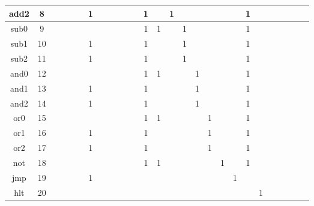 \documentclass[UTF8]{ctexrep}
\begin{document}
\begin{landscape}
\begin{center}
{\begin{tabular}{|c|c|c|c|c|c|c|c|c|c|c|c|c|c|c|c|c|c|c|c|c|c|c|c|c|c|c|}
add2  & 8           &   &   &   &   & 1 &   &   &   &   &   & 1  &    & 1  &    &    &    &    &    & 1  &    &     &     &     &    &    \\ \hline
sub0  & 9           &   &   &   &   &   &   &   &   &   &   & 1  & 1  &    & 1  &    &    &    &    & 1  &    &     &     &     &    &    \\ \hline
sub1  & 10          &   &   &   &   & 1 &   &   &   &   &   & 1  &    &    & 1  &    &    &    &    & 1  &    &     &     &     &    &    \\ \hline
sub2  & 11          &   &   &   &   & 1 &   &   &   &   &   & 1  &    &    & 1  &    &    &    &    & 1  &    &     &     &     &    &    \\ \hline
and0  & 12          &   &   &   &   &   &   &   &   &   &   & 1  & 1  &    &    & 1  &    &    &    & 1  &    &     &     &     &    &    \\ \hline
and1  & 13          &   &   &   &   & 1 &   &   &   &   &   & 1  &    &    &    & 1  &    &    &    & 1  &    &     &     &     &    &    \\ \hline
and2  & 14          &   &   &   &   & 1 &   &   &   &   &   & 1  &    &    &    & 1  &    &    &    & 1  &    &     &     &     &    &    \\ \hline
or0   & 15          &   &   &   &   &   &   &   &   &   &   & 1  & 1  &    &    &    & 1  &    &    & 1  &    &     &     &     &    &    \\ \hline
or1   & 16          &   &   &   &   & 1 &   &   &   &   &   & 1  &    &    &    &    & 1  &    &    & 1  &    &     &     &     &    &    \\ \hline
or2   & 17          &   &   &   &   & 1 &   &   &   &   &   & 1  &    &    &    &    & 1  &    &    & 1  &    &     &     &     &    &    \\ \hline
not   & 18          &   &   &   &   &   &   &   &   &   &   & 1  & 1  &    &    &    &    & 1  &    & 1  &    &     &     &     &    &    \\ \hline
jmp   & 19          &   &   &   &   & 1 &   &   &   &   &   &    &    &    &    &    &    &    & 1  &    &    &     &     &     &    &    \\ \hline
hlt   & 20          &   &   &   &   &   &   &   &   &   &   &    &    &    &    &    &    &    &    &    & 1  &     &     &     &    &    \\ \hline
\end{tabular}
}
\end{center}
\end{landscape}
\end{document}

